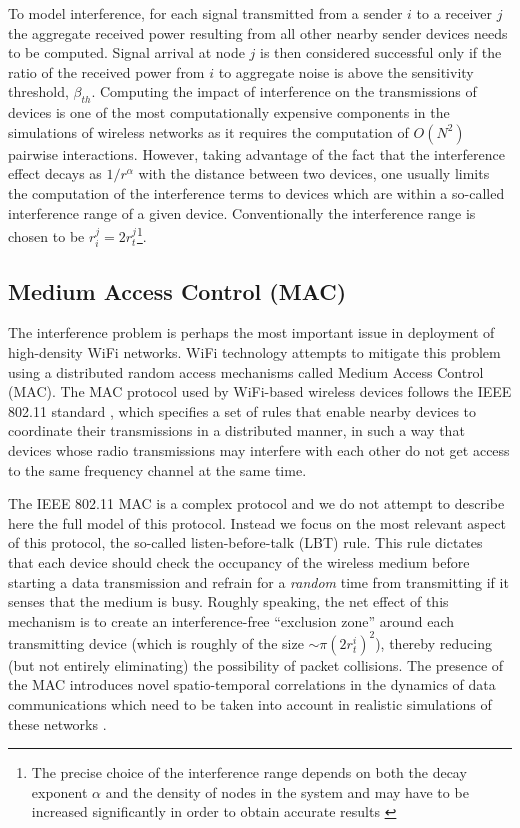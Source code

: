 \documentclass{elsart}
\begin{document}
To model interference, for each signal transmitted 
from a sender $i$ to a receiver $j$  
the aggregate received power resulting from all other  nearby sender 
devices needs to be computed. Signal arrival at node $j$ is then 
considered successful only if  the ratio of the 
received power from $i$  to aggregate noise is above the sensitivity 
threshold, $\beta_{th}$. Computing the impact of interference on the transmissions of devices 
is one of the most computationally expensive components in the  simulations
of wireless networks as it requires the computation of $ O(N^2)$ pairwise 
interactions. However, taking advantage of the fact that the 
interference effect decays as $1/r^\alpha$ with the distance between two 
devices, one usually limits the computation of the interference terms 
to devices which are within a so-called interference range of  a given 
device. Conventionally the interference range is chosen to be 
$r_i^j=2r_t^j$\footnote{The precise choice of the interference range 
depends on both the decay exponent $\alpha$ and the density of 
nodes in the system and may have to be increased significantly 
in order to obtain accurate results \cite{bogodia2}}.


\subsection{Medium Access Control (MAC)}
The interference problem is perhaps the most important issue 
in deployment of high-density WiFi
networks. WiFi technology attempts to mitigate  this problem 
using  a distributed random access mechanisms called Medium Access Control
(MAC). 
The MAC protocol used by  WiFi-based wireless devices follows the 
IEEE 802.11 standard \cite{wifi}, which specifies a set of
rules that enable nearby devices to coordinate their transmissions 
in a distributed manner,
in such a way that devices whose radio transmissions may interfere with each 
other do not get access to the same frequency channel at the same time. 

The IEEE 802.11 MAC is a   
complex protocol and we do not attempt to describe here 
the full model of this protocol.
Instead we focus on the most relevant aspect of this protocol, the so-called 
listen-before-talk (LBT) rule. This rule  dictates that each device should 
check the occupancy of the wireless medium before starting a data transmission 
and refrain for a {\it random} time from  
transmitting if it senses that the medium is busy.
Roughly speaking, the net effect of this mechanism is 
to create an interference-free ``exclusion zone'' around each transmitting 
device (which is roughly of the size $\sim \pi (2r^i_t)^2$), 
thereby reducing (but not entirely eliminating) the possibility of packet 
collisions. 
The presence of the MAC introduces novel spatio-temporal correlations 
in the dynamics of data communications which need to be taken into account 
in realistic simulations of these networks \cite{maziar-worms}.
\end{document}
